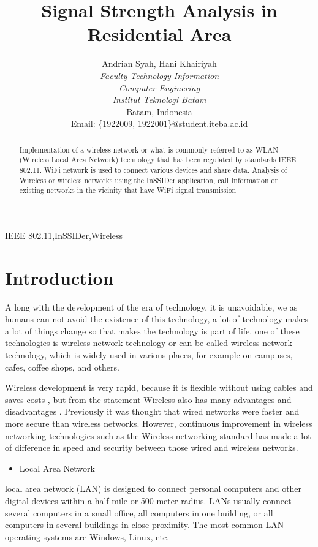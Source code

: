 \documentclass[conference]{IEEEtran}
\title{Signal Strength Analysis in Residential Area}
\author{Andrian Syah\IEEEauthorrefmark{1}, Hani Khairiyah\IEEEauthorrefmark{2}\\
\textit{Faculty Technology Information}\\
\textit{Computer Enginering}\\
\textit{Institut Teknologi Batam}\\
Batam, Indonesia\\
Email: \{\IEEEauthorrefmark{1}1922009, \IEEEauthorrefmark{2}1922001\}@student.iteba.ac.id}
\begin{document}
\maketitle

\begin{abstract}
    Implementation of a wireless network or what is commonly referred to as WLAN (Wireless Local Area Network) technology that has been regulated by standards
    IEEE 802.11. WiFi network is used to connect various devices and share data.
    Analysis of Wireless or wireless networks using the InSSIDer application,
    call Information on existing networks in the vicinity that have WiFi signal transmission
\end{abstract}

\begin{IEEEkeywords}
    IEEE 802.11,InSSIDer,Wireless
\end{IEEEkeywords}

\section{Introduction}
A long with the development of the era of technology, it is unavoidable,
we as humans can not avoid the existence of this technology,
a lot of technology makes a lot of things change so that makes the technology
is part of life. one of these technologies is wireless network technology or can be called wireless network technology, which is widely used in various places, for example on campuses, cafes, coffee shops, and others.

Wireless development is very rapid, because it is flexible without using cables and saves costs
, but from the statement Wireless also has many advantages and disadvantages .
Previously it was thought that wired networks were faster and more secure than wireless networks.
However, continuous improvement in wireless networking technologies such as the Wireless networking standard
 has made a lot of difference in speed and security between those wired and wireless networks.

 \begin{itemize}
    \item Local Area Network
\end{itemize}

local area network (LAN) is designed to connect personal computers and other digital devices within a half mile or 500 meter radius.
LANs usually connect several computers in a small office, all computers in one building, or all computers in several buildings in close proximity.
The most common LAN operating systems are Windows, Linux, etc.
\end{document}
